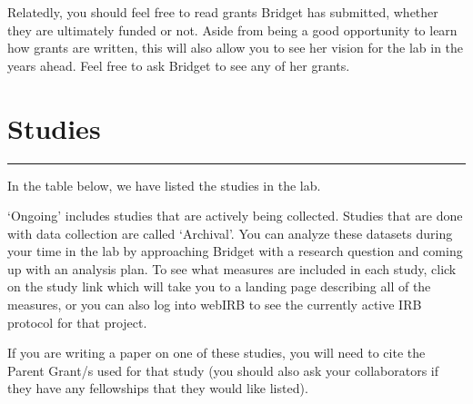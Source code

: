 \documentclass[
]{book}
\begin{document}
Relatedly, you should feel free to read grants Bridget has submitted, whether they are ultimately funded or not. Aside from being a good opportunity to learn how grants are written, this will also allow you to see her vision for the lab in the years ahead. Feel free to ask Bridget to see any of her grants.

\hypertarget{studies}{%
\chapter{Studies}\label{studies}}

\begin{center}\rule{0.5\linewidth}{0.5pt}\end{center}

In the table below, we have listed the studies in the lab.

`Ongoing' includes studies that are actively being collected. Studies that are done with data collection are called `Archival'. You can analyze these datasets during your time in the lab by approaching Bridget with a research question and coming up with an analysis plan. To see what measures are included in each study, click on the study link which will take you to a landing page describing all of the measures, or you can also log into webIRB to see the currently active IRB protocol for that project.

If you are writing a paper on one of these studies, you will need to cite the Parent Grant/s used for that study (you should also ask your collaborators if they have any fellowships that they would like listed).
\end{document}
